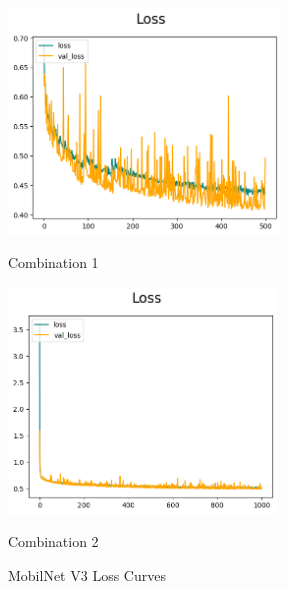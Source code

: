 \begin{figure}[H]
    \centering
    \begin{minipage}[b]{0.49\textwidth}
        \centering
        \includegraphics[width=\textwidth, height=6cm]{Figures/balanced_data/more_data/withoutbn/mn3/loss.png}
        \captionsetup{labelformat=empty}
        \caption{Combination 1}
        \label{fig:u_wo_r_l}
    \end{minipage}
    \hfill
    \begin{minipage}[b]{0.49\textwidth}
        \centering
        \includegraphics[width=\textwidth, height=6cm]{Figures/balanced_data/more_data/withbn/mn3/loss.png}
        \captionsetup{labelformat=empty}
        \caption{Combination 2}
        \label{fig:u_w_r_l}
    \end{minipage}
    \captionsetup{labelformat=default}
    \caption{MobilNet V3 Loss Curves}
\end{figure}


